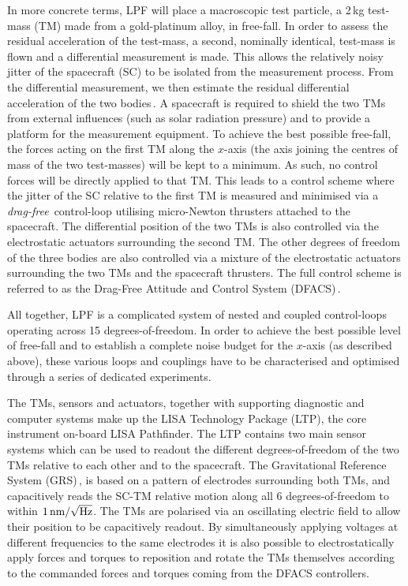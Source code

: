 In more concrete terms, LPF will place a macroscopic test particle, a 2\,kg test-mass
(TM) made from a gold-platinum alloy, in free-fall. In order to assess the residual
acceleration of the test-mass, a second, nominally identical, test-mass
is flown and a differential measurement is made. This allows the relatively noisy
jitter of the spacecraft (SC) to be isolated from the measurement process. From
the differential measurement, we then estimate the residual differential acceleration
of the two bodies\,\cite{LuigiAcc}. A spacecraft is required to shield the
two TMs from external influences (such as solar radiation pressure) and to provide
a platform for the measurement equipment. To achieve the best possible free-fall,
the forces acting on the first TM along the $x$-axis (the axis joining the
centres of mass of the two test-masses) will be kept to a minimum. As such, no
control forces will be directly applied to that TM. This leads to a control scheme
where the jitter of the SC relative to the first TM is measured and minimised
via a \emph{drag-free}\,\cite{fichter05} control-loop utilising micro-Newton
thrusters attached to the spacecraft. The differential position of the two TMs is
also controlled via the electrostatic actuators surrounding the second TM. The
other degrees of freedom of the three bodies are also controlled via a mixture
of the electrostatic actuators surrounding the two TMs and the spacecraft thrusters.
The full control scheme is referred to as the Drag-Free Attitude and Control
System (DFACS)\,\cite{gerndt09}.

All together, LPF is a complicated system of nested and coupled control-loops operating
across 15 degrees-of-freedom. In order to achieve the best possible level
of free-fall and to establish a complete noise budget for the $x$-axis (as
described above), these various loops and couplings have to be characterised and
optimised through a series of dedicated experiments.

The TMs, sensors and actuators, together with supporting diagnostic and computer systems
make up the LISA Technology Package (LTP), the core instrument on-board LISA
Pathfinder. The LTP contains two main sensor systems which can be used to readout
the different degrees-of-freedom of the two TMs relative to each other and
to the spacecraft. The Gravitational Reference System (GRS)\,\cite{Dolesi03}, is
based on a pattern of electrodes surrounding both TMs, and capacitively reads
the SC-TM relative motion along all 6 degrees-of-freedom to within $1\,{\rm nm}/\sqrt{\rm
Hz}$. The TMs are polarised via an oscillating electric field to allow
their position to be capacitively readout. By simultaneously applying voltages
at different frequencies to the same electrodes it is also possible to electrostatically
apply forces and torques to reposition and rotate the TMs themselves according
to the commanded forces and torques coming from the DFACS controllers.


